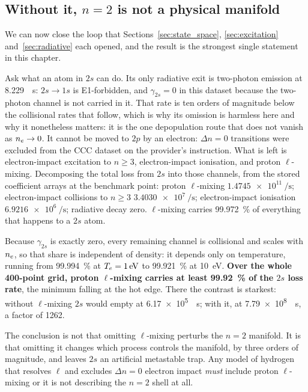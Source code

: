 \subsection{Without it, \texorpdfstring{$n=2$}{n=2} is not a physical manifold}

We can now close the loop that Sections~\ref{sec:state_space},
\ref{sec:excitation} and~\ref{sec:radiative} each opened, and the result is the
strongest single statement in this chapter.

Ask what an atom in $2s$ can do. Its only radiative exit is two-photon emission
at \SI{8.229}{\per\second}: $2s \to 1s$ is E1-forbidden, and $\gamma_{2s} = 0$
in this dataset because the two-photon channel is not carried in it. That rate
is ten orders of magnitude below the collisional rates that follow, which is why
its omission is harmless here and why it nonetheless matters: it is the one
depopulation route that does not vanish as $n_e \to 0$. It cannot be moved to $2p$ by an electron: $\Delta n = 0$
transitions were excluded from the CCC dataset on the provider's instruction.
What is left is electron-impact excitation to $n \ge 3$, electron-impact
ionisation, and proton $\ell$-mixing. Decomposing the total loss from $2s$ into
those channels, from the stored coefficient arrays at the benchmark point:
proton $\ell$-mixing $\SI{1.4745e11}{\per\second}$; electron-impact collisions
to $n \ge 3$ $\SI{3.4030e7}{\per\second}$; electron-impact ionisation
$\SI{6.9216e6}{\per\second}$; radiative decay zero. $\ell$-mixing carries
\SI{99.972}{\percent} of everything that happens to a $2s$ atom.

Because $\gamma_{2s}$ is exactly zero, every remaining channel is collisional
and scales with $n_e$, so that share is independent of density: it depends only
on temperature, running from \SI{99.994}{\percent} at
$T_e = \SI{1}{\electronvolt}$ to \SI{99.921}{\percent} at
\SI{10}{\electronvolt}. \textbf{Over the whole 400-point grid, proton
$\ell$-mixing carries at least \SI{99.92}{\percent} of the $2s$ loss rate}, the
minimum falling at the hot edge. There the contrast is starkest: without
$\ell$-mixing $2s$ would empty at \SI{6.17e5}{\per\second}; with it, at
\SI{7.79e8}{\per\second}, a factor of 1262.

The conclusion is not that omitting $\ell$-mixing perturbs the $n=2$ manifold.
It is that omitting it changes which process controls the manifold, by three
orders of magnitude, and leaves $2s$ an artificial metastable trap. Any model of
hydrogen that resolves $\ell$ and excludes $\Delta n = 0$ electron impact
\emph{must} include proton $\ell$-mixing or it is not describing the $n=2$ shell
at all.

